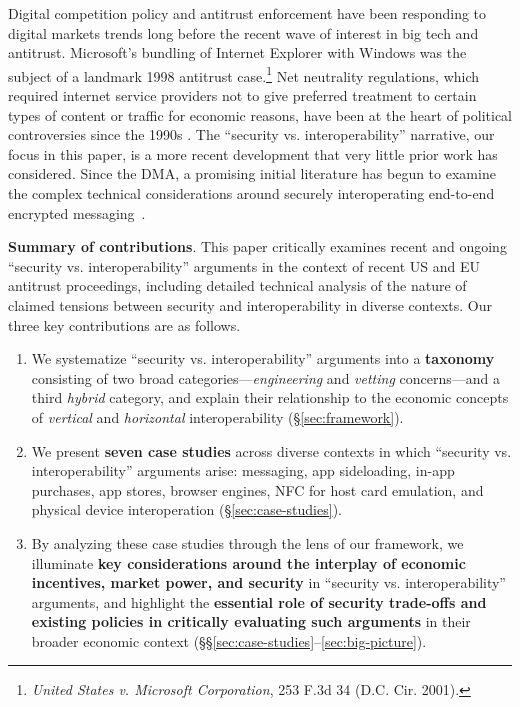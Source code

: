 \documentclass[letterpaper,twocolumn,10pt]{article}
\newcommand{\subh}[1]{\smallskip \noindent \textbf{{#1}}.}
\renewcommand{\paragraph}[1]{\subh{#1}}
\begin{document}
Digital competition policy and antitrust enforcement have been responding to digital markets trends long before the recent wave of interest in big tech and antitrust. Microsoft's bundling of Internet Explorer with Windows was the subject of a landmark 1998 antitrust case.\footnote{\emph{United States v. Microsoft Corporation}, 253 F.3d 34 (D.C. Cir. 2001).} Net neutrality regulations, which required internet service providers not to give preferred treatment to certain types of content or traffic for economic reasons, have been at the heart of political controversies since the 1990s \cite{nyt_net_neutrality, nn1, nn2, nn3, nn4, nn5, nn6}. The ``security vs. interoperability'' narrative, our focus in this paper, is a more recent development that very little prior work has considered. Since the DMA, a promising initial literature has begun to examine the complex technical considerations around securely  interoperating end-to-end encrypted messaging~\cite{dma_concerns_e2ee_ross,dma_how_to_e2ee}.

\smallskip
\paragraph{Summary of contributions}
This paper critically examines recent and ongoing ``security vs. interoperability'' arguments in the context of recent US and EU antitrust proceedings, including detailed technical analysis of the nature of claimed tensions between security and interoperability in diverse contexts. Our three key contributions are as follows.

\begin{enumerate}
    \item We systematize ``security vs. interoperability'' arguments into a \textbf{taxonomy} consisting of two broad categories---\emph{engineering} and \emph{vetting} concerns---and a third \emph{hybrid} category, and explain their relationship to the economic concepts of \emph{vertical} and \emph{horizontal} interoperability   (\S \ref{sec:framework}). 
    \item We present \textbf{seven case studies} across diverse contexts in which ``security vs. interoperability'' arguments arise: messaging, app sideloading, in-app purchases, app stores, browser engines, NFC for host card emulation, and physical device interoperation (\S\ref{sec:case-studies}). 
    \item By analyzing these case studies through the lens of our framework, we illuminate \textbf{key considerations around the interplay of economic incentives, market power, and security} in ``security vs. interoperability'' arguments, and highlight the \textbf{essential role of security trade-offs and existing policies in critically evaluating such arguments} in their broader economic context (\S\S\ref{sec:case-studies}--\ref{sec:big-picture}).
\end{enumerate}
\end{document}
